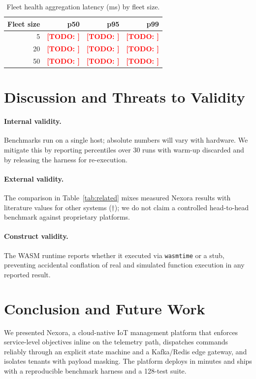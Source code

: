 \documentclass[review,12pt]{elsarticle}
\newcommand{\TODO}[1]{\textcolor{red}{\textbf{[TODO: #1]}}}
\begin{document}
\begin{table}[h]
\centering
\caption{Fleet health aggregation latency (ms) by fleet size.}
\label{tab:fleet}
\begin{tabular}{rrrr}
\toprule
Fleet size & p50 & p95 & p99 \\
\midrule
5  & \TODO{} & \TODO{} & \TODO{} \\
20 & \TODO{} & \TODO{} & \TODO{} \\
50 & \TODO{} & \TODO{} & \TODO{} \\
\bottomrule
\end{tabular}
\end{table}

\section{Discussion and Threats to Validity}
\label{sec:discussion}
\paragraph{Internal validity.} Benchmarks run on a single host; absolute numbers
will vary with hardware. We mitigate this by reporting percentiles over 30 runs
with warm-up discarded and by releasing the harness for re-execution.
\paragraph{External validity.} The comparison in Table~\ref{tab:related} mixes
measured Nexora results with literature values for other systems ($\dagger$);
we do not claim a controlled head-to-head benchmark against proprietary
platforms.
\paragraph{Construct validity.} The WASM runtime reports whether it executed via
\texttt{wasmtime} or a stub, preventing accidental conflation of real and
simulated function execution in any reported result.

\section{Conclusion and Future Work}
\label{sec:conclusion}
We presented Nexora, a cloud-native IoT management platform that enforces
service-level objectives inline on the telemetry path, dispatches commands
reliably through an explicit state machine and a Kafka/Redis edge gateway, and
isolates tenants with payload masking. The platform deploys in minutes and ships
with a reproducible benchmark harness and a 128-test suite.
\end{document}
